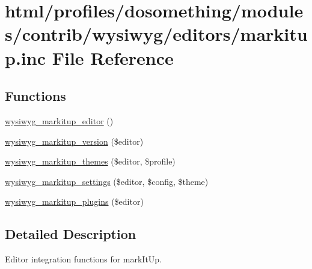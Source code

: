 \hypertarget{markitup_8inc}{
\section{html/profiles/dosomething/modules/contrib/wysiwyg/editors/markitup.inc File Reference}
\label{markitup_8inc}
}
\subsection*{Functions}
\begin{DoxyCompactItemize}
\item 
\hyperlink{markitup_8inc_a0df072123c61c0478ecbb5da680d639a}{wysiwyg\_\-markitup\_\-editor} ()
\item 
\hyperlink{markitup_8inc_ac697a2d7f7865c6b3dac074e92028311}{wysiwyg\_\-markitup\_\-version} (\$editor)
\item 
\hyperlink{markitup_8inc_af28d3628d3dfa4d5014ffcda5226a847}{wysiwyg\_\-markitup\_\-themes} (\$editor, \$profile)
\item 
\hyperlink{markitup_8inc_a29b61f58bf5058571e17120a6f582769}{wysiwyg\_\-markitup\_\-settings} (\$editor, \$config, \$theme)
\item 
\hyperlink{markitup_8inc_aa80650467ba21eddceb4a487843d92a9}{wysiwyg\_\-markitup\_\-plugins} (\$editor)
\end{DoxyCompactItemize}


\subsection{Detailed Description}
Editor integration functions for markItUp. 

